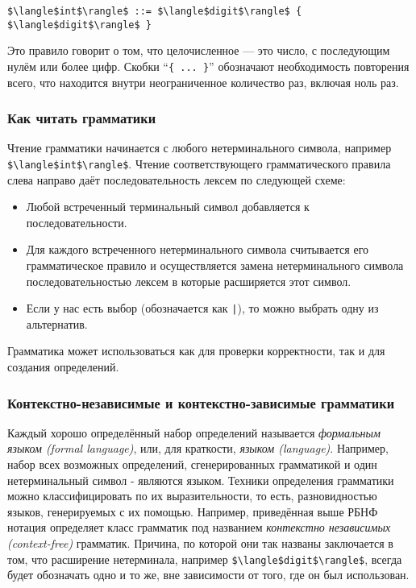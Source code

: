 \begin{lstlisting}
$\langle$int$\rangle$ ::= $\langle$digit$\rangle$ { $\langle$digit$\rangle$ }
\end{lstlisting}

Это правило говорит о том, что целочисленное --- это число, с последующим нулём или более цифр. Скобки ``\lstinline|{ ... }|'' обозначают необходимость повторения всего, что находится внутри неограниченное количество раз, включая ноль раз.

\subsubsection{Как читать грамматики}

Чтение грамматики начинается с любого нетерминального символа, например \lstinline|$\langle$int$\rangle$|. Чтение соответствующего грамматического правила слева направо даёт последовательность лексем по следующей схеме:

\begin{itemize}
\item{Любой встреченный терминальный символ добавляется к последовательности.}

\item{Для каждого встреченного нетерминального символа считывается его грамматическое правило и осуществляется замена нетерминального символа последовательностью лексем в которые расширяется этот символ.}

\item{Если у нас есть выбор (обозначается как \lstinline!|!), то можно выбрать одну из альтернатив.}
\end{itemize}

Грамматика может использоваться как для проверки корректности, так и для создания определений.

\subsubsection{Контекстно-независимые и контекстно-зависимые грамматики}

Каждый хорошо определённый набор определений называется \emph{формальным языком (formal language)}, или, для краткости, \emph{языком (language)}. Например, набор всех возможных определений, сгенерированных грамматикой и один нетерминальный символ - являются языком. Техники определения грамматики можно классифицировать по их выразительности, то есть, разновидностью языков, генерируемых с их помощью. Например, приведённая выше РБНФ нотация определяет класс грамматик под названием \emph{контекстно независимых (context-free)} грамматик. Причина, по которой они так названы заключается в том, что расширение нетерминала, например \lstinline|$\langle$digit$\rangle$|, всегда будет обозначать одно и то же, вне зависимости от того, где он был использован.

